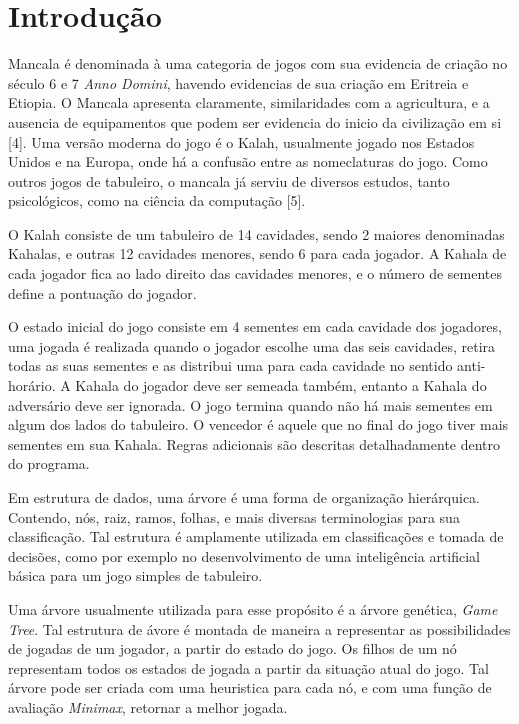 \documentclass[a4paper, 12pt]{article}
\begin{document}
	
	\section{Introdução}
		\textrm{Mancala é denominada à uma categoria de jogos com sua evidencia de criação no século 6 e 7 \emph{Anno Domini}, havendo evidencias de sua criação em Eritreia e Etiopia. O Mancala apresenta claramente, similaridades com a agricultura, e a ausencia de equipamentos que podem ser evidencia do inicio da civilização em si [4]. Uma versão moderna do jogo é o Kalah, usualmente jogado nos Estados Unidos e na Europa, onde há a confusão entre as nomeclaturas do jogo. Como outros jogos de tabuleiro, o mancala já serviu de diversos estudos, tanto psicológicos, como na ciência da computação [5].}
		
		\textrm{O Kalah consiste de um tabuleiro de 14 cavidades, sendo 2 maiores denominadas Kahalas, e outras 12 cavidades menores, sendo 6 para cada jogador. A Kahala de cada jogador fica ao lado direito das cavidades menores, e o número de sementes define a pontuação do jogador.}
		
		\textrm{O estado inicial do jogo consiste em 4 sementes em cada cavidade dos jogadores, uma jogada é realizada quando o jogador escolhe uma das seis cavidades, retira todas as suas sementes e as distribui uma para cada cavidade no sentido anti-horário. A Kahala do jogador deve ser semeada também, entanto a Kahala do adversário deve ser ignorada. O jogo termina quando não há mais sementes em algum dos lados do tabuleiro. O vencedor é aquele que no final do jogo tiver mais sementes em sua Kahala. Regras adicionais são descritas detalhadamente dentro do programa.}
	
		\textrm{Em estrutura de dados, uma árvore é uma forma de organização hierárquica. Contendo, nós, raiz, ramos, folhas, e mais diversas terminologias para sua classificação. Tal estrutura é amplamente utilizada em classificações e tomada de decisões, como por exemplo no desenvolvimento de uma inteligência artificial básica para um jogo simples de tabuleiro.}
		
		\textrm{Uma árvore usualmente utilizada para esse propósito é a árvore genética, \emph{Game Tree}. Tal estrutura de ávore é montada de maneira a representar as possibilidades de jogadas de um jogador, a partir do estado do jogo. Os filhos de um nó representam todos os estados de jogada a partir da situação atual do jogo. Tal árvore pode ser criada com uma heuristica para cada nó, e com uma função de avaliação \emph{Minimax}, retornar a melhor jogada.}
		
\end{document}
